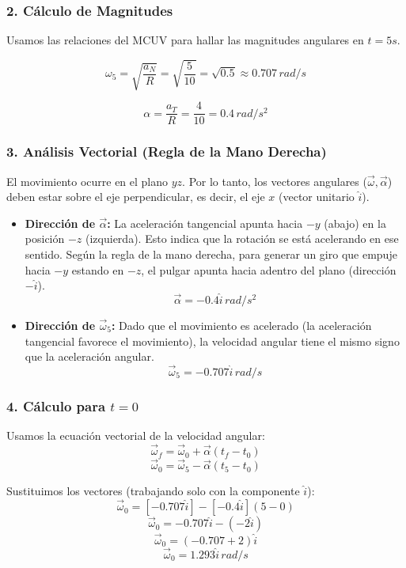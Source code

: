 \documentclass[12pt, a4paper]{article}
\begin{document}
\subsubsection*{2. Cálculo de Magnitudes}
Usamos las relaciones del MCUV para hallar las magnitudes angulares en $t=5\si{s}$.

$$ \omega_5 = \sqrt{\frac{a_N}{R}} = \sqrt{\frac{5}{10}} = \sqrt{0.5} \approx 0.707 \, \si{rad/s} $$

$$ \alpha = \frac{a_T}{R} = \frac{4}{10} = 0.4 \, \si{rad/s^2} $$

\subsubsection*{3. Análisis Vectorial (Regla de la Mano Derecha)}
El movimiento ocurre en el plano $yz$. Por lo tanto, los vectores angulares ($\vec{\omega}, \vec{\alpha}$) deben estar sobre el eje perpendicular, es decir, el eje $x$ (vector unitario $\hat{i}$).

\begin{itemize}
    \item \textbf{Dirección de $\vec{\alpha}$:} La aceleración tangencial apunta hacia $-y$ (abajo) en la posición $-z$ (izquierda). Esto indica que la rotación se está acelerando en ese sentido. Según la regla de la mano derecha, para generar un giro que empuje hacia $-y$ estando en $-z$, el pulgar apunta hacia adentro del plano (dirección $-\hat{i}$).
    $$ \vec{\alpha} = -0.4\hat{i} \, \si{rad/s^2} $$
    
    \item \textbf{Dirección de $\vec{\omega}_5$:} Dado que el movimiento es acelerado (la aceleración tangencial favorece el movimiento), la velocidad angular tiene el mismo signo que la aceleración angular.
    $$ \vec{\omega}_5 = -0.707\hat{i} \, \si{rad/s} $$
\end{itemize}

\subsubsection*{4. Cálculo para $t=0$}
Usamos la ecuación vectorial de la velocidad angular:
$$ \vec{\omega}_f = \vec{\omega}_0 + \vec{\alpha}(t_f - t_0) $$
$$ \vec{\omega}_0 = \vec{\omega}_5 - \vec{\alpha}(t_5 - t_0) $$

Sustituimos los vectores (trabajando solo con la componente $\hat{i}$):
$$ \vec{\omega}_0 = [-0.707\hat{i}] - [-0.4\hat{i}](5 - 0) $$
$$ \vec{\omega}_0 = -0.707\hat{i} - (-2\hat{i}) $$
$$ \vec{\omega}_0 = (-0.707 + 2)\hat{i} $$
$$ \vec{\omega}_0 = 1.293\hat{i} \, \si{rad/s} $$
\end{document}
